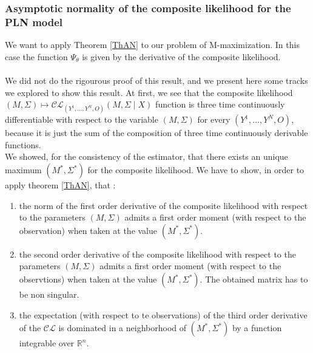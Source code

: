 \documentclass[11pt, a4paper]{article}
\begin{document}
\subsubsection{Asymptotic normality of the composite likelihood for the PLN model}
We want to apply Theorem \ref{ThAN} to our problem of M-maximization. In this case the function $\Psi_\theta$ is given by the derivative of the composite likelihood.\\
\\
We did not do the rigourous proof of this result, and we present here some tracks we explored to show this result.
At first, we see that the composite likelihood $(M,\Sigma) \mapsto \mathcal{CL}_{(Y^1,...,Y^N,O)}(M,\Sigma \mid X)$ function is three time continuously differentiable with respect to the variable $(M,\Sigma)$ for every $(Y^1,...,Y^N,O)$, because it is just the sum of the composition of three time continuously derivable functions.\\
We showed, for the consistency of the estimator, that there exists an unique maximum $(M^*,\Sigma^*)$ for the composite likelihood. We have to show, in order to apply theorem \ref{ThAN}, that :
\begin{enumerate}
\item the norm of the first order derivative of the composite likelihood with respect to the parameters $(M,\Sigma)$ admits a first order  moment (with respect to the observation) when taken at the value $(M ^*,\Sigma^*)$. 
\item the second order derivative of the composite likelihood with respect to the parameters $(M,\Sigma)$ admits a first order moment (with respect to the observtions) when taken at the value $(M^*,\Sigma^*)$. The obtained matrix has to be non singular.
\item the expectation (with respect to te observations) of the third order derivative of the $\mathcal{CL}$ is dominated in a neighborhood of $(M^*,\Sigma^*)$ by a function integrable over $\mathbb{R}^n$.
\end{enumerate}
\end{document}

